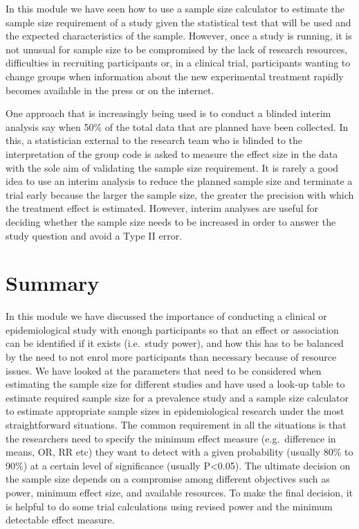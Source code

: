 \documentclass[
  a4paper,
]{memoir}
\begin{document}
In this module we have seen how to use a sample size calculator to
estimate the sample size requirement of a study given the statistical
test that will be used and the expected characteristics of the sample.
However, once a study is running, it is not unusual for sample size to
be compromised by the lack of research resources, difficulties in
recruiting participants or, in a clinical trial, participants wanting to
change groups when information about the new experimental treatment
rapidly becomes available in the press or on the internet.

One approach that is increasingly being used is to conduct a blinded
interim analysis say when 50\% of the total data that are planned have
been collected. In this, a statistician external to the research team
who is blinded to the interpretation of the group code is asked to
measure the effect size in the data with the sole aim of validating the
sample size requirement. It is rarely a good idea to use an interim
analysis to reduce the planned sample size and terminate a trial early
because the larger the sample size, the greater the precision with which
the treatment effect is estimated. However, interim analyses are useful
for deciding whether the sample size needs to be increased in order to
answer the study question and avoid a Type II error.

\section{Summary}\label{summary-2}

In this module we have discussed the importance of conducting a clinical
or epidemiological study with enough participants so that an effect or
association can be identified if it exists (i.e.~study power), and how
this has to be balanced by the need to not enrol more participants than
necessary because of resource issues. We have looked at the parameters
that need to be considered when estimating the sample size for different
studies and have used a look-up table to estimate required sample size
for a prevalence study and a sample size calculator to estimate
appropriate sample sizes in epidemiological research under the most
straightforward situations. The common requirement in all the situations
is that the researchers need to specify the minimum effect measure
(e.g.~difference in means, OR, RR etc) they want to detect with a given
probability (usually 80\% to 90\%) at a certain level of significance
(usually P\textless0.05). The ultimate decision on the sample size
depends on a compromise among different objectives such as power,
minimum effect size, and available resources. To make the final
decision, it is helpful to do some trial calculations using revised
power and the minimum detectable effect measure.
\end{document}
